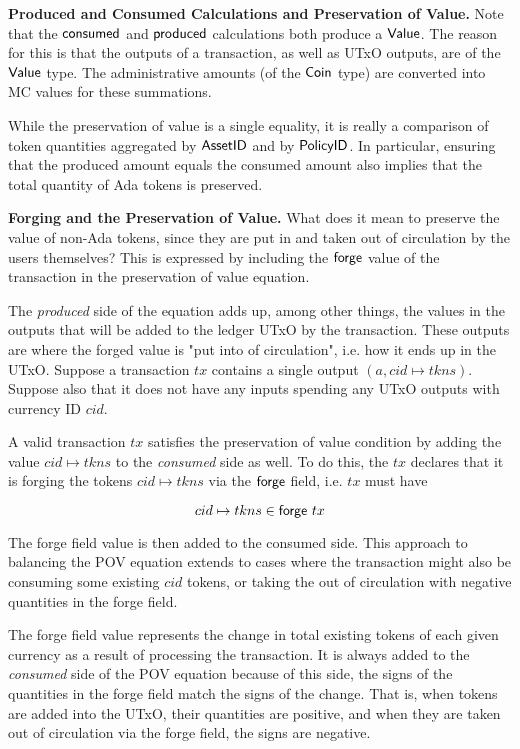 \textbf{Produced and Consumed Calculations and Preservation of Value.}
Note that
the $\mathsf{consumed}$ and $\mathsf{produced}$ calculations both produce a $\mathsf{Value}$.
The reason for this is that the outputs of a transaction, as well as UTxO outputs,
are of the $\mathsf{Value}$ type. The administrative amounts (of the $\mathsf{Coin}$ type)
are converted into MC values for these summations.

While the preservation of value is a single
equality, it is really a comparison of token quantities aggregated by
$\mathsf{AssetID}$ and by $\mathsf{PolicyID}$. In particular, ensuring that the produced
amount equals the consumed amount also implies that the total quantity of
Ada tokens is preserved.

\textbf{Forging and the Preservation of Value.}
What does it mean to preserve the value of non-Ada tokens, since they
are put in and taken out of circulation by the users themselves?
This is expressed by including the $\mathsf{forge}$ value of the transaction
in the preservation of value equation.

The \textit{produced} side of the equation adds up, among other things, the
values in the
outputs that will be added to the ledger UTxO by the transaction. These outputs are
where the
forged value is "put into of circulation", i.e. how it ends up in the UTxO.
Suppose a transaction $tx$ contains a single output $(a, cid \mapsto tkns)$. Suppose
also that it does not
have any inputs spending any UTxO outputs with currency ID $cid$.

A valid transaction $tx$ satisfies the preservation of value
condition by adding the value $cid \mapsto tkns$ to the \textit{consumed} side as well.
To do this, the $tx$ declares that it is forging the tokens $cid \mapsto tkns$
via the $\mathsf{forge}$ field, i.e. $tx$ must have

\[cid \mapsto tkns\in\mathsf{forge}~tx\]

The forge field value is then added to the consumed side. This approach
to balancing the POV equation extends
to cases where the transaction might also be consuming some existing $cid$ tokens,
or taking the out of circulation with negative quantities in the forge field.

The forge field value represents the change in total existing tokens of each given currency
as a result of processing the transaction. It is always added to the
\textit{consumed} side of the POV equation because of this side, the signs of the
quantities in the forge field match the signs of the change. That is,
when tokens are added into the UTxO, their quantities are positive, and when they are
taken out of circulation via the forge field, the signs are negative.

